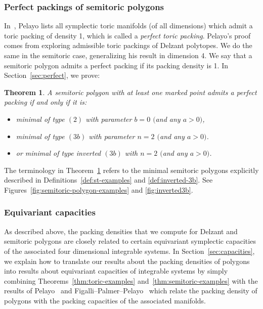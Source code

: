 \documentclass[10pt,a4paper]{amsart}
\numberwithin{equation}{section}
\newtheorem{Theorem}{Theorem}[section]
\theoremstyle{definition}
\theoremstyle{plain}
\theoremstyle{plain}
\begin{document}
\subsubsection{Perfect packings of semitoric polygons}

In~\cite{Pe2006}, Pelayo lists all symplectic toric manifolds (of all dimensions) which admit a toric packing of density 1, which is called a \emph{perfect toric packing}.
Pelayo's proof comes from exploring admissible toric packings of Delzant polytopes. We do the same in the semitoric case, generalizing his result in dimension 4. We say that a semitoric polygon admits a perfect packing if its packing density is 1. In Section~\ref{sec:perfect}, we prove:

\begin{Theorem}\label{thm:perfect}
A semitoric polygon with at least one marked point admits a perfect packing if and only if it is:
\begin{itemize}\itemsep=0pt
 \item minimal of type $(2)$ with parameter $b=0$ $($and any $a>0)$,
 \item minimal of type $(3b)$ with parameter $n=2$ $($and any $a>0)$.
 \item or minimal of type inverted $(3b)$ with $n=2$ $($and any $a>0)$.
\end{itemize}
\end{Theorem}

The terminology in Theorem~\ref{thm:perfect} refers to the minimal semitoric polygons explicitly described in Definitions~\ref{def:st-examples} and \ref{def:inverted-3b}. See Figures~\ref{fig:semitoric-polygon-examples} and \ref{fig:inverted3b}.

\subsubsection{Equivariant capacities}
As described above, the packing densities that we compute for Delzant and semitoric polygons are closely related to certain equivariant symplectic capacities of the associated four dimensional integrable systems.
In Section~\ref{sec:capacities}, we explain how to translate our results about the packing densities of polygons into results about equivariant capacities of integrable systems
 by simply combining Theorems~\ref{thm:toric-examples} and~\ref{thm:semitoric-examples} with the results of Pelayo~\cite{Pe2006, Pe2007} and Figalli--Palmer--Pelayo~\cite{FiPaPe2016} which relate the packing density of polygons with the packing capacities of the associated manifolds.
\end{document}

